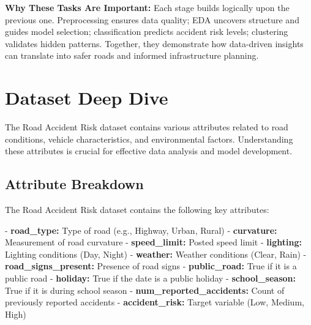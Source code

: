 \documentclass[12pt,a4paper]{article}
\begin{document}
\begin{infobox}
\textbf{Why These Tasks Are Important:}
Each stage builds logically upon the previous one. Preprocessing ensures data quality; EDA uncovers structure and guides model selection; classification predicts accident risk levels; clustering validates hidden patterns. Together, they demonstrate how data-driven insights can translate into safer roads and informed infrastructure planning.
\end{infobox}

\section{Dataset Deep Dive}

The Road Accident Risk dataset contains various attributes related to road conditions, vehicle characteristics, and environmental factors. Understanding these attributes is crucial for effective data analysis and model development.

\subsection{Attribute Breakdown}

The Road Accident Risk dataset contains the following key attributes:

- \textbf{road\_type:} Type of road (e.g., Highway, Urban, Rural)
- \textbf{curvature:} Measurement of road curvature
- \textbf{speed\_limit:} Posted speed limit
- \textbf{lighting:} Lighting conditions (Day, Night)
- \textbf{weather:} Weather conditions (Clear, Rain)
- \textbf{road\_signs\_present:} Presence of road signs
- \textbf{public\_road:} True if it is a public road
- \textbf{holiday:} True if the date is a public holiday
- \textbf{school\_season:} True if it is during school season
- \textbf{num\_reported\_accidents:} Count of previously reported accidents
- \textbf{accident\_risk:} Target variable (Low, Medium, High)
\end{document}
